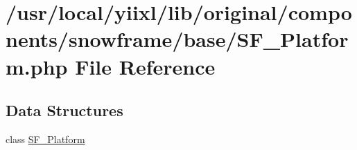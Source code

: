 \hypertarget{SF__Platform_8php}{
\section{/usr/local/yiixl/lib/original/components/snowframe/base/SF\_\-Platform.php File Reference}
\label{SF__Platform_8php}
}
\subsection*{Data Structures}
\begin{DoxyCompactItemize}
\item 
class \hyperlink{classSF__Platform}{SF\_\-Platform}
\end{DoxyCompactItemize}
